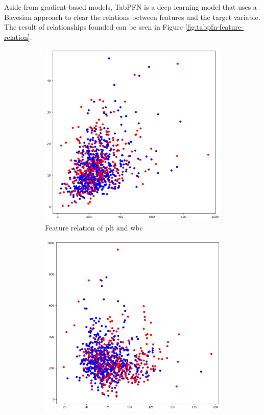 \documentclass[../main.tex]{subfiles}
\begin{document}
Aside from gradient-based models, TabPFN is a deep learning model that uses a Bayesian approach to clear the relations between features and the target variable.
The result of relationships founded can be seen in Figure \ref{fig:tabpfn-feature-relation}.

\begin{figure}
    \centering
    \begin{subfigure}{0.45\textwidth}
        \centering
        \includegraphics[width=\linewidth]{Figure/tabpfn-plt-wbc.png}
        \caption{Feature relation of plt and wbc}
        \label{fig:tabpfn-plt-wbc}
    \end{subfigure}
    \hfill
    \begin{subfigure}{0.45\textwidth}
        \centering
        \includegraphics[width=\linewidth]{Figure/tabpfn-weight-plt.png}

\end{subfigure}
\end{figure}
\end{document}
